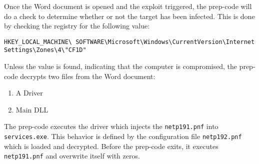 \documentclass[11pt,english,a4paper]{report}
\begin{document}
Once the Word document is opened and the exploit triggered, the prep-code will do a check to determine whether or not the target has been infected. This is done by checking the registry for the following value:
\begin{lstlisting}
HKEY_LOCAL_MACHINE\ SOFTWARE\Microsoft\Windows\CurrentVersion\Internet Settings\Zones\4\"CF1D" 
\end{lstlisting}
Unless the value is found, indicating that the computer is compromised, the prep-code decrypts two files from the Word document:
 \begin{enumerate}
   \item  A Driver
   \item  Main DLL
  \end{enumerate}
{\raggedright
The prep-code executes the driver which injects the \texttt{netp191.pnf} into \texttt{services.exe}. This behavior is defined by the configuration file \texttt{netp192.pnf} which is loaded and decrypted. Before the prep-code exits, it executes \texttt{netp191.pnf} and overwrite itself with zeros. 
\par}
\end{document}
